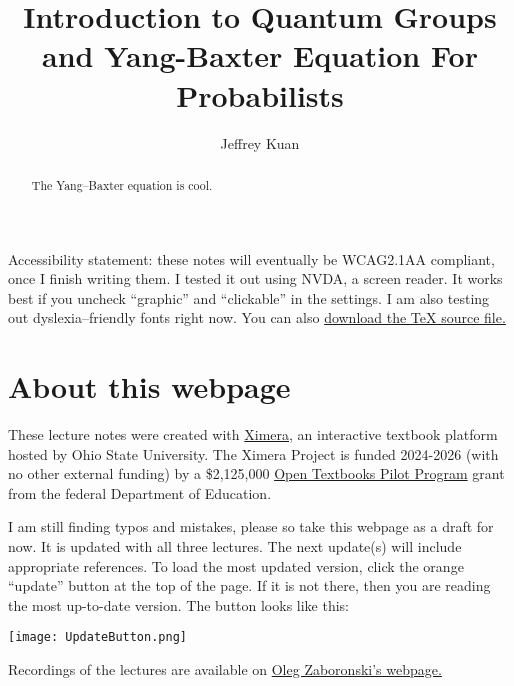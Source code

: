 \documentclass{ximera}
\author{Jeffrey Kuan}
\title{Introduction to Quantum Groups and Yang-Baxter Equation For Probabilists}
\begin{document}
\begin{abstract}
   The Yang--Baxter equation is cool. 
\end{abstract}
\maketitle


Accessibility statement: these notes will eventually be WCAG2.1AA compliant, once I finish writing them. I tested it out using NVDA, a screen reader.
It works best if you uncheck ``graphic'' and ``clickable'' in the settings. I am also testing out dyslexia--friendly 
fonts right now. 
You can also \href{https://ximera.osu.edu/firststeps24html/aFirstStepInXimera/basics/Introduction_to_Quantum_Groups.tex}{download the TeX source file.}

\section{About this webpage}
These lecture notes were created with \href{https://ximera.osu.edu/}{Ximera}, an 
interactive textbook platform hosted by Ohio State University. The Ximera Project is funded 2024-2026 (with no other external funding) by a 
\$2,125,000 \href{https://www.ed.gov/grants-and-programs/grants-higher-education/improvement-postsecondary-education/open-textbooks-pilot-program}{Open Textbooks Pilot Program} grant from the federal Department of Education.

I am still finding typos and mistakes, please so take this webpage as a draft for now. It is updated with all three lectures.
The next update(s) will include appropriate references. To load the most updated version, click the orange ``update'' button
at the top of the page. If it is not there, then you are reading the most up-to-date version. The button looks like this:

\texttt{[image: UpdateButton.png]}

Recordings of the lectures are available on  
\href{https://warwick.ac.uk/fac/sci/maths/people/staff/oleg_zaboronski/jeffrey_kuan_visit/}{Oleg Zaboronski's webpage.} 
\end{document}
